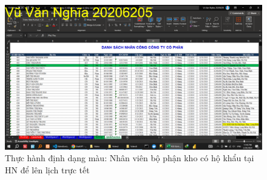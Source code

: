 \documentclass{article}
\begin{document}
\begin{figure}[h]
\centering
\includegraphics[scale = 0.15]{Video8/ThucHanh/6.png}
\caption{Thực hành định dạng màu: Nhân viên bộ phận kho có hộ khẩu tại HN để lên lịch trực tết}
\end{figure}
\end{document}
